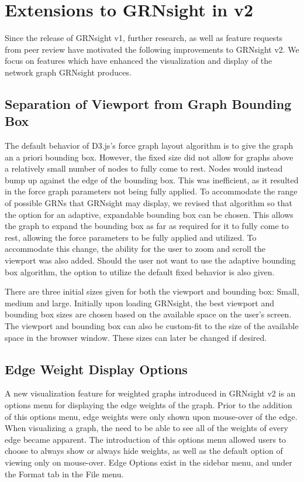 \documentclass[sigconf,review]{acmart}
\begin{document}
\section{Extensions to GRNsight in v2}
Since the release of GRNsight v1, further research, as well as feature requests from peer review have 
motivated the following improvements to GRNsight v2. We focus on features which have enhanced the 
visualization and display of the network graph GRNsight produces.

\subsection{Separation of Viewport from Graph Bounding Box}
The default behavior of D3.js's force graph layout algorithm is to give the graph an a priori bounding 
box. However, the fixed size did not allow for graphs above a relatively small number of nodes to fully 
come to rest. Nodes would instead bump up against the edge of the bounding box. This was inefficient, as 
it resulted in the force graph parameters not being fully applied. To accommodate the range of possible 
GRNs that GRNsight may display, we revised that algorithm so that the option for an adaptive, expandable 
bounding box can be chosen. This allows the graph to expand the bounding box as far as required for it 
to fully come to rest, allowing the force parameters to be fully applied and utilized. To accommodate 
this change, the ability for the user to zoom and scroll the viewport was also added. Should the user 
not want to use the adaptive bounding box algorithm, the option to utilize the default fixed behavior is 
also given. 

There are three initial sizes given for both the viewport and bounding box: Small, medium and large. 
Initially upon loading GRNsight, the best viewport and bounding box sizes are chosen based on the 
available space on the user's screen. The viewport and bounding box can also be custom-fit to the size 
of the available space in the browser window. These sizes can later be changed if desired. 

\subsection{Edge Weight Display Options}
A new visualization feature for weighted graphs introduced in GRNsight v2 is an options menu for 
displaying the edge weights of the graph. Prior to the addition of this options menu, edge weights were 
only shown upon mouse-over of the edge. When visualizing a graph, the need to be able to see all of the 
weights of every edge became apparent. The introduction of this options menu allowed users to choose to 
always show or always hide weights, as well as the default option of viewing only on mouse-over. Edge 
Options exist in the sidebar menu, and under the Format tab in the File menu.
\end{document}
